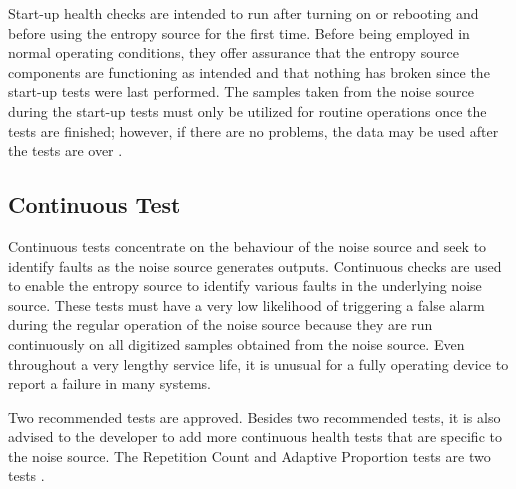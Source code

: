 Start-up health checks are intended to run after turning on or rebooting and before using the entropy source for the first time. Before being employed in normal operating conditions, they offer assurance that the entropy source components are functioning as intended and that nothing has broken since the start-up tests were last performed. The samples taken from the noise source during the start-up tests must only be utilized for routine operations once the tests are finished; however, if there are no problems, the data may be used after the tests are over \cite{SP90B-2018}.

%
%
\subsection{Continuous Test}
\label{subsec:fundamentals:HTT:CT}

Continuous tests concentrate on the behaviour of the noise source and seek to identify faults as the noise source generates outputs. Continuous checks are used to enable the entropy source to identify various faults in the underlying noise source. These tests must have a very low likelihood of triggering a false alarm during the regular operation of the noise source because they are run continuously on all digitized samples obtained from the noise source. Even throughout a very lengthy service life, it is unusual for a fully operating device to report a failure in many systems.

Two recommended tests are approved. Besides two recommended tests, it is also advised to the developer to add more continuous health tests that are specific to the noise source. The Repetition Count and Adaptive Proportion tests are two tests \cite{SP90B-2}.

